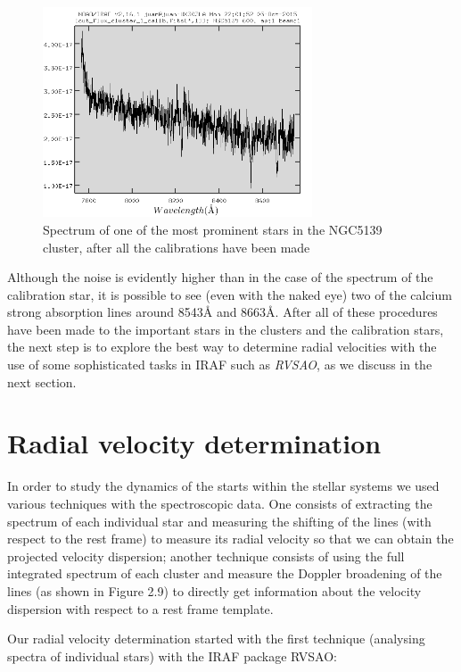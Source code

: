 \begin{figure}[H]
\centering
\includegraphics[width=8cm]{images/cluster_star_flux.png}
\caption[Spectrum of a prominent star of the NGC5139 globular cluster]{Spectrum of one of the most prominent stars in the NGC5139 cluster, after all the calibrations have been made}
\end{figure}

Although the noise is evidently higher than in the case of the spectrum of the calibration star, it is possible to see (even with the naked eye) two of the calcium strong absorption lines around 8543\AA$ $ and 8663\AA. After all of these procedures have been made to the important stars in the clusters and the calibration stars, the next step is to explore the best way to determine radial velocities with the use of some sophisticated tasks in IRAF such as \textit{RVSAO}, as we discuss in the next section. 

\section{Radial velocity determination}

In order to study the dynamics of the starts within the stellar systems we used various techniques with the spectroscopic data. One consists of extracting the spectrum of each individual star and measuring the shifting of the lines (with respect to the rest frame) to measure its radial velocity so that we can obtain the projected velocity dispersion; another technique consists of using the full integrated spectrum of each cluster and measure the Doppler broadening of the lines (as shown in Figure 2.9) to directly get information about the velocity dispersion with respect to a rest frame template. 

Our radial velocity determination started with the first technique (analysing spectra of individual stars) with the IRAF package RVSAO:

